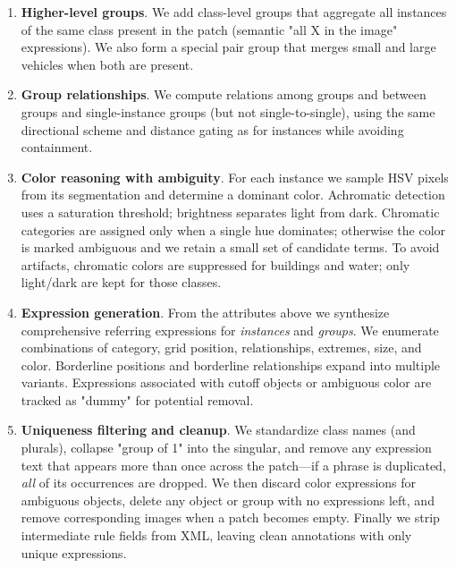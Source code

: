 \begin{enumerate}
    \item \textbf{Higher-level groups}. We add class-level groups that aggregate all instances of the same class present in the patch (semantic "all X in the image" expressions). We also form a special pair group that merges small and large vehicles when both are present.
    \item \textbf{Group relationships}. We compute relations among groups and between groups and single-instance groups (but not single-to-single), using the same directional scheme and distance gating as for instances while avoiding containment.
    \item \textbf{Color reasoning with ambiguity}. For each instance we sample HSV pixels from its segmentation and determine a dominant color. Achromatic detection uses a saturation threshold; brightness separates light from dark. Chromatic categories are assigned only when a single hue dominates; otherwise the color is marked ambiguous and we retain a small set of candidate terms. To avoid artifacts, chromatic colors are suppressed for buildings and water; only light/dark are kept for those classes.
    \item \textbf{Expression generation}. From the attributes above we synthesize comprehensive referring expressions for \emph{instances} and \emph{groups}. We enumerate combinations of category, grid position, relationships, extremes, size, and color. Borderline positions and borderline relationships expand into multiple variants. Expressions associated with cutoff objects or ambiguous color are tracked as "dummy" for potential removal.
    \item \textbf{Uniqueness filtering and cleanup}. We standardize class names (and plurals), collapse "group of 1" into the singular, and remove any expression text that appears more than once across the patch—if a phrase is duplicated, \emph{all} of its occurrences are dropped. We then discard color expressions for ambiguous objects, delete any object or group with no expressions left, and remove corresponding images when a patch becomes empty. Finally we strip intermediate rule fields from XML, leaving clean annotations with only unique expressions.
\end{enumerate}

